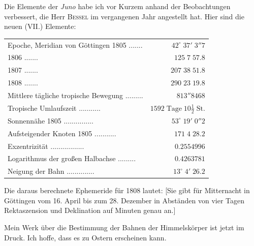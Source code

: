 \par\indent Die Elemente der \emph{Juno} habe ich vor Kurzem anhand der Beobachtungen verbessert, die Herr \textsc{Bessel} im vergangenen Jahr angestellt hat. Hier sind die neuen (VII.) Elemente:


\begin{center}\fontsize{10}{12}\selectfont\setlength{\tabcolsep}{3pt}\renewcommand{\arraystretch}{1.15}\begin{tabular}{lr}
Epoche, Meridian von Göttingen 1805 .\;.\;.\;.\;.\;.\;.\; & $42^\circ\;37'\;3''7$ \\
1806 .\;.\;.\;.\;.\;.\;.\; & $125\;7\;57.8$ \\
1807 .\;.\;.\;.\;.\;.\;.\; & $207\;38\;51.8$ \\
1808 .\;.\;.\;.\;.\;.\;.\; & $290\;23\;19.8$ \\
Mittlere tägliche tropische Bewegung .\;.\;.\;.\;.\;.\;.\;.\;.\; & $813''8468$ \\
Tropische Umlaufszeit .\;.\;.\;.\;.\;.\;.\;.\;.\;.\;.\; & $1592\;\text{Tage}\;10\tfrac12\;\text{St.}$ \\
Sonnennähe 1805 .\;.\;.\;.\;.\;.\;.\;.\;.\;.\;.\;.\;.\;.\;.\; & $53^\circ\;19'\;0''2$ \\
Aufsteigender Knoten 1805 .\;.\;.\;.\;.\;.\;.\;.\;.\;.\;.\; & $171\;4\;28.2$ \\
Exzentrizität .\;.\;.\;.\;.\;.\;.\;.\;.\;.\;.\;.\;.\;.\;.\;.\;.\; & $0.2554996$ \\
Logarithmus der großen Halbachse .\;.\;.\;.\;.\;.\;.\;.\;.\; & $0.4263781$ \\
Neigung der Bahn .\;.\;.\;.\;.\;.\;.\;.\;.\;.\;.\;.\;.\;.\; & $13^\circ\;4'\;26.2$ \\
\end{tabular}\end{center}


\par\indent Die daraus berechnete Ephemeride für 1808 lautet: [Sie gibt für Mitternacht in Göttingen vom 16. April bis zum 28. Dezember in Abständen von vier Tagen Rektaszension und Deklination auf Minuten genau an.]

\par\indent Mein Werk über die Bestimmung der Bahnen der Himmelskörper ist jetzt im Druck. Ich hoffe, dass es zu Ostern erscheinen kann.

